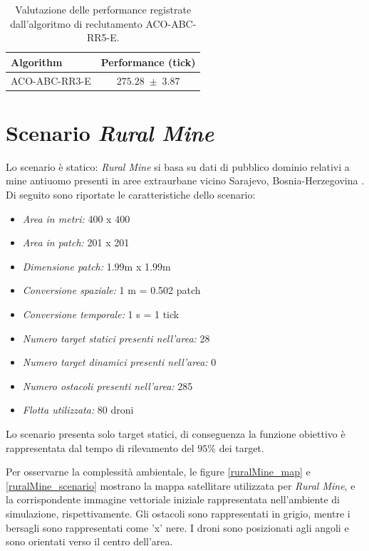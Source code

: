 \begin{table}[H]
    \centering
    \captionsetup{justification=centering, margin=2cm, font=footnotesize}
    \begin{tabular}{|l|c|}
    \hline
    \textbf{Algorithm}              & \textbf{Performance (tick)}              \\ \hline
    ACO-ABC-RR3-E                & $275.28 \; \pm \; 3.87$           \\ \hline
    \end{tabular}%
    
    \caption{Valutazione delle performance registrate dall'algoritmo di reclutamento ACO-ABC-RR5-E.}
    \label{tabella_performance_dump}
\end{table}

\section{Scenario \textit{Rural Mine}}

Lo scenario è statico: \textit{Rural Mine} si basa su dati di pubblico dominio relativi a mine antiuomo presenti in aree extraurbane vicino Sarajevo, Bosnia-Herzegovina \cite{seedemining2018}.
Di seguito sono riportate le caratteristiche dello scenario:

\begin{itemize}
    \item \textit{Area in metri:} 400 x 400
    \item \textit{Area in patch:} 201 x 201
    \item \textit{Dimensione patch:} 1.99m x 1.99m
    \item \textit{Conversione spaziale:} 1 m = 0.502 patch
    \item \textit{Conversione temporale:} 1 s = 1 tick
    \item \textit{Numero target statici presenti nell'area:} 28
    \item \textit{Numero target dinamici presenti nell'area:} 0
    \item \textit{Numero ostacoli presenti nell'area:} 285
    \item \textit{Flotta utilizzata:} 80 droni
\end{itemize}

Lo scenario presenta solo target statici, di conseguenza la funzione obiettivo è rappresentata dal tempo di rilevamento del $95 \%$ dei target.

Per osservarne la complessità ambientale, le figure \ref{ruralMine_map} e \ref{ruralMine_scenario} mostrano la mappa satellitare utilizzata per \textit{Rural Mine}, e la corrispondente immagine vettoriale iniziale rappresentata nell'ambiente di simulazione, rispettivamente. 
Gli ostacoli  sono rappresentati in grigio, mentre i bersagli sono rappresentati come 'x' nere. 
I droni sono posizionati agli angoli e sono orientati verso il centro dell'area.

